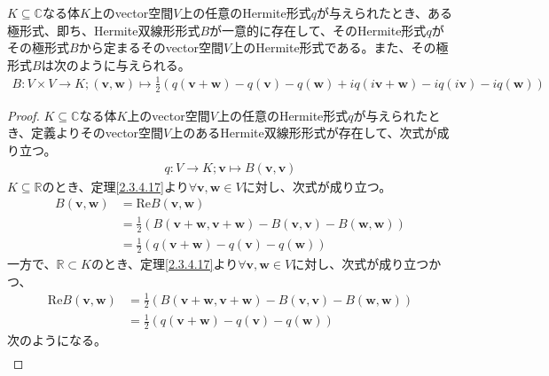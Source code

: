 \documentclass[dvipdfmx]{jsarticle}
\begin{document}
\begin{thm}\label{2.3.5.2}
$K \subseteq \mathbb{C}$なる体$K$上のvector空間$V$上の任意のHermite形式$q$が与えられたとき、ある極形式、即ち、Hermite双線形形式$B$が一意的に存在して、そのHermite形式$q$がその極形式$B$から定まるそのvector空間$V$上のHermite形式である。また、その極形式$B$は次のように与えられる。
\begin{align*}
B:V \times V \rightarrow K;\left( \mathbf{v},\mathbf{w} \right) \mapsto \frac{1}{2}\left( q\left( \mathbf{v} + \mathbf{w} \right) - q\left( \mathbf{v} \right) - q\left( \mathbf{w} \right) + iq\left( i\mathbf{v} + \mathbf{w} \right) - iq\left( i\mathbf{v} \right) - iq\left( \mathbf{w} \right) \right)
\end{align*}
\end{thm}
\begin{proof}
$K \subseteq \mathbb{C}$なる体$K$上のvector空間$V$上の任意のHermite形式$q$が与えられたとき、定義よりそのvector空間$V$上のあるHermite双線形形式が存在して、次式が成り立つ。
\begin{align*}
q:V \rightarrow K;\mathbf{v} \mapsto B\left( \mathbf{v},\mathbf{v} \right)
\end{align*}
$K \subseteq \mathbb{R}$のとき、定理\ref{2.3.4.17}より$\forall\mathbf{v},\mathbf{w} \in V$に対し、次式が成り立つ。
\begin{align*}
B\left( \mathbf{v},\mathbf{w} \right) &= {\mathrm{Re}}{B\left( \mathbf{v},\mathbf{w} \right)}\\
&= \frac{1}{2}\left( B\left( \mathbf{v} + \mathbf{w},\mathbf{v} + \mathbf{w} \right) - B\left( \mathbf{v},\mathbf{v} \right) - B\left( \mathbf{w},\mathbf{w} \right) \right)\\
&= \frac{1}{2}\left( q\left( \mathbf{v} + \mathbf{w} \right) - q\left( \mathbf{v} \right) - q\left( \mathbf{w} \right) \right)
\end{align*}
一方で、$\mathbb{R} \subset K$のとき、定理\ref{2.3.4.17}より$\forall\mathbf{v},\mathbf{w} \in V$に対し、次式が成り立つかつ、
\begin{align*}
{\mathrm{Re}}{B\left( \mathbf{v},\mathbf{w} \right)} &= \frac{1}{2}\left( B\left( \mathbf{v} + \mathbf{w},\mathbf{v} + \mathbf{w} \right) - B\left( \mathbf{v},\mathbf{v} \right) - B\left( \mathbf{w},\mathbf{w} \right) \right)\\
&= \frac{1}{2}\left( q\left( \mathbf{v} + \mathbf{w} \right) - q\left( \mathbf{v} \right) - q\left( \mathbf{w} \right) \right)
\end{align*}
次のようになる。
\begin{align*}

\end{align*}
\end{proof}
\end{document}
